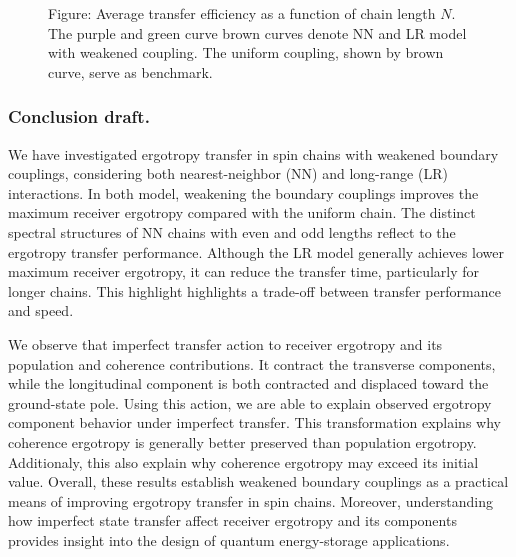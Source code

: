 \documentclass[../../../main.tex]{subfiles}
\begin{document}
\begin{figure}
  \centering
  \caption{Figure: Average transfer efficiency as a function of chain length $N$. The purple and green curve brown curves denote NN and LR model with weakened coupling.  The uniform coupling, shown by brown curve, serve as benchmark.}
\end{figure}

\subsubsection{Conclusion draft.}
We have investigated ergotropy transfer in spin chains with weakened boundary couplings, considering both nearest-neighbor (NN) and long-range (LR) interactions. 
In both model, weakening the boundary couplings improves the maximum receiver ergotropy compared with the uniform chain. 
The distinct spectral structures of NN chains with even and odd lengths reflect to the ergotropy transfer performance. 
Although the LR model generally achieves lower maximum receiver ergotropy, it can reduce the transfer time, particularly for longer chains. 
This highlight highlights a trade-off between transfer performance and speed.

We observe that imperfect transfer action to receiver ergotropy and its population and coherence contributions.
It contract the transverse components, while the longitudinal component is both contracted and displaced toward the ground-state pole.
Using this action, we are able to explain observed ergotropy component behavior under imperfect transfer.
This transformation explains why coherence ergotropy is generally better preserved than population ergotropy.
Additionaly, this also explain why coherence ergotropy may exceed its initial value.
Overall, these results establish weakened boundary couplings as a practical means of improving ergotropy transfer in spin chains.
Moreover, understanding how imperfect state transfer affect receiver ergotropy and its components provides insight into the design of quantum energy-storage applications.
\end{document}
